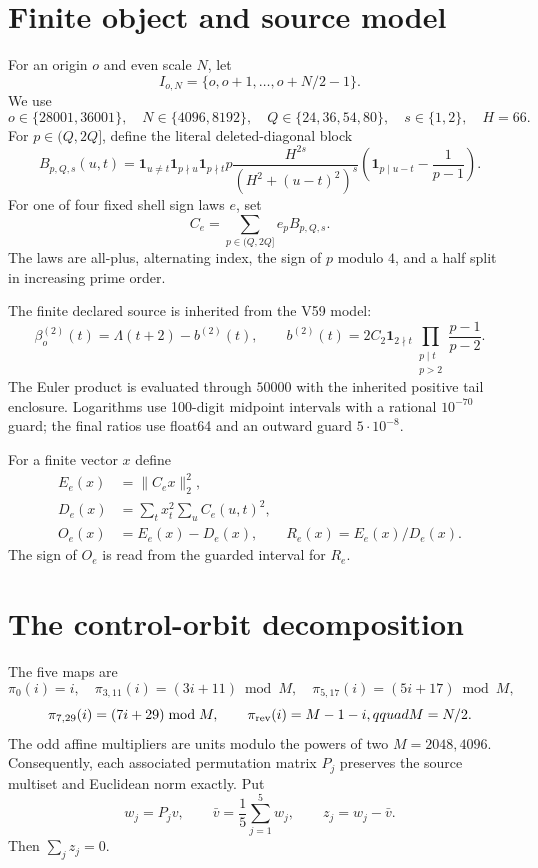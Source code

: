 \documentclass[10pt]{article}
\newcommand{\ind}{\mathbf 1}
\begin{document}
\section{Finite object and source model}

For an origin $o$ and even scale $N$, let
\[
 I_{o,N}=\{o,o+1,\ldots,o+N/2-1\}.
\]
We use
\[
 o\in\{28001,36001\},\quad N\in\{4096,8192\},\quad
 Q\in\{24,36,54,80\},\quad s\in\{1,2\},\quad H=66.
\]
For $p\in(Q,2Q]$, define the literal deleted-diagonal block
\begin{equation}\label{eq:block}
 B_{p,Q,s}(u,t)=
 \ind_{u\ne t}\ind_{p\nmid u}\ind_{p\nmid t}
 p\frac{H^{2s}}{(H^2+(u-t)^2)^s}
 \left(\ind_{p\mid u-t}-\frac1{p-1}\right).
\end{equation}
For one of four fixed shell sign laws $e$, set
\[
 C_e=\sum_{p\in(Q,2Q]}e_pB_{p,Q,s}.
\]
The laws are all-plus, alternating index, the sign of $p$ modulo $4$, and a
half split in increasing prime order.

The finite declared source is inherited from the V59 model:
\begin{equation}\label{eq:source}
 \beta_o^{(2)}(t)=\Lambda(t+2)-b^{(2)}(t),\qquad
 b^{(2)}(t)=2C_2\ind_{2\nmid t}
 \prod_{\substack{p\mid t\\p>2}}\frac{p-1}{p-2}.
\end{equation}
The Euler product is evaluated through $50000$ with the inherited positive
tail enclosure.  Logarithms use 100-digit midpoint intervals with a rational
$10^{-70}$ guard; the final ratios use float64 and an outward guard
$5\cdot10^{-8}$.

For a finite vector $x$ define
\begin{align}
 E_e(x)&=\|C_ex\|_2^2,\\
 D_e(x)&=\sum_t x_t^2\sum_u C_e(u,t)^2,\\
 O_e(x)&=E_e(x)-D_e(x),\qquad R_e(x)=E_e(x)/D_e(x).
\end{align}
The sign of $O_e$ is read from the guarded interval for $R_e$.

\section{The control-orbit decomposition}

The five maps are
\[
 \pi_0(i)=i,\quad \pi_{3,11}(i)=(3i+11)\bmod M,\quad
 \pi_{5,17}(i)=(5i+17)\bmod M,
\]
\[
 \pi_{7,29}(i)=(7i+29)\bmod M,\qquad
 \pi_{\rm rev}(i)=M-1-i,qquad M=N/2.
\]
The odd affine multipliers are units modulo the powers of two $M=2048,4096$.
Consequently, each associated permutation matrix $P_j$ preserves the source
multiset and Euclidean norm exactly.  Put
\[
 w_j=P_jv,\qquad \bar v=\frac15\sum_{j=1}^5w_j,
 \qquad z_j=w_j-\bar v.
\]
Then $\sum_jz_j=0$.
\end{document}
